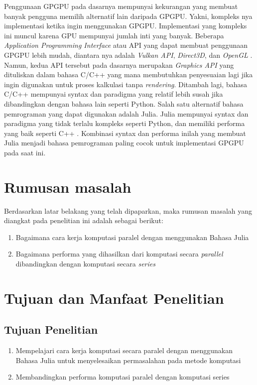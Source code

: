 
Penggunaan GPGPU pada dasarnya mempunyai kekurangan yang membuat banyak pengguna
memilih alternatif lain daripada GPGPU. Yakni, kompleks nya implementasi ketika
ingin menggunakan GPGPU. Implementasi yang kompleks ini muncul karena GPU mempunyai
jumlah inti yang banyak. Beberapa \emph{Application Programming Interface} atau API
\citep{evansonExplainerWhatAPI2021} yang dapat membuat penggunaan GPGPU lebih
mudah, diantara nya adalah \emph{Vulkan API}, \emph{Direct3D}, dan \emph{OpenGL}
\citep{khairySurveyArchitecturalApproaches2019}. Namun, kedua API tersebut pada dasarnya
merupakan \emph{Graphics API} yang dituliskan dalam bahasa C/C++ yang mana
membutuhkan penyesuaian lagi jika ingin digunakan untuk proses kalkulasi tanpa
\emph{rendering}. Ditambah lagi, bahasa C/C++ mempunyai syntax dan paradigma yang
relatif lebih susah jika dibandingkan dengan bahasa lain seperti Python. Salah
satu alternatif bahasa pemrograman yang dapat digunakan adalah Julia. Julia mempunyai
syntax dan paradigma yang tidak terlalu kompleks seperti Python, dan memiliki
performa yang baik seperti C++ \cite{bezansonJuliaMicroBenchmarks2023}. Kombinasi
syntax dan performa inilah yang membuat Julia menjadi bahasa pemrograman paling cocok
untuk implementasi GPGPU pada saat ini.

\section{Rumusan masalah}
Berdasarkan latar belakang yang telah dipaparkan, maka rumusan masalah yang
diangkat pada penelitian ini adalah sebagai berikut:
\begin{enumerate}
  \item Bagaimana cara kerja komputasi paralel dengan menggunakan Bahasa Julia

  \item Bagaimana performa yang dihasilkan dari komputasi secara \emph{parallel}
    dibandingkan dengan komputasi secara \emph{series}
\end{enumerate}

\section{Tujuan dan Manfaat Penelitian}
\subsection{Tujuan Penelitian}
\begin{enumerate}
  \item Mempelajari cara kerja komputasi secara paralel dengan menggunakan Bahasa
    Julia untuk menyelesaikan permasalahan pada metode komputasi

  \item Membandingkan performa komputasi paralel dengan komputasi series
\end{enumerate}

